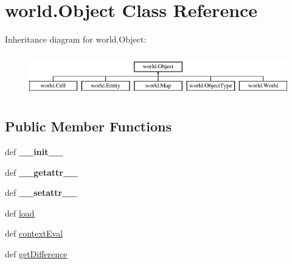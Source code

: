 \hypertarget{classworld_1_1_object}{\section{world.\-Object \-Class \-Reference}
\label{classworld_1_1_object}
}
\-Inheritance diagram for world.\-Object\-:\begin{figure}[H]
\begin{center}
\leavevmode
\includegraphics[height=1.866667cm]{classworld_1_1_object}
\end{center}
\end{figure}
\subsection*{\-Public \-Member \-Functions}
\begin{DoxyCompactItemize}
\item 
\hypertarget{classworld_1_1_object_adefdff05a80c764df6a91c497c9d27da}{def {\bfseries \-\_\-\-\_\-init\-\_\-\-\_\-}}\label{classworld_1_1_object_adefdff05a80c764df6a91c497c9d27da}

\item 
\hypertarget{classworld_1_1_object_af0b8e5af06bcfba8ffb6ff5e77be5466}{def {\bfseries \-\_\-\-\_\-getattr\-\_\-\-\_\-}}\label{classworld_1_1_object_af0b8e5af06bcfba8ffb6ff5e77be5466}

\item 
\hypertarget{classworld_1_1_object_a8a1746e28f09cb166298611273b89801}{def {\bfseries \-\_\-\-\_\-setattr\-\_\-\-\_\-}}\label{classworld_1_1_object_a8a1746e28f09cb166298611273b89801}

\item 
def \hyperlink{classworld_1_1_object_a5763929b18e99a5859c51c356cf6aa95}{load}
\item 
def \hyperlink{classworld_1_1_object_a033e92753d3a3013ce0f802ac68561df}{context\-Eval}
\item 
def \hyperlink{classworld_1_1_object_aa4304e2f484eeb9c706e58fe5e8c463f}{get\-Difference}
\end{DoxyCompactItemize}
